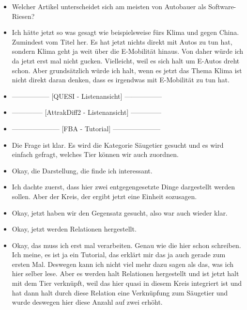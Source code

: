 {\begin{itemize}[]
    Vielleicht aus dem Gefühl heraus \flqq Auto-Bloggerin nimmt Tesla-Modell auseinander\frqq{}. 
    Einfach, weil es da wahrscheinlich sehr viel um Software gehen wird und um den Autobauer an sich.
    \item {} Welcher Artikel unterscheidet sich am meisten von \flqq Autobauer als Software-Riesen\frqq{}?
    \item {} Ich hätte jetzt so was gesagt wie beispielsweise \flqq fürs Klima und gegen China\frqq{}. 
    Zumindest vom Titel her.
    Es hat jetzt nichts direkt mit Autos zu tun hat, sondern Klima geht ja weit über die E-Mobilität hinaus.
    Von daher würde ich da jetzt erst mal nicht gucken. 
    Vielleicht, weil es sich halt um E-Autos dreht schon. 
    Aber grundsätzlich würde ich halt, wenn es jetzt das Thema Klima ist nicht direkt daran denken, dass es irgendwas mit E-Mobilität zu tun hat.
    \item {-----------------} [QUESI - Listenansicht] {-----------------}
    \item {--------------} [AttrakDiff2 - Listenansicht] {--------------}
    \item {---------------------} [FBA - Tutorial] {---------------------}
    \item {} Die Frage ist klar. 
    Es wird die Kategorie Säugetier gesucht und es wird einfach gefragt, welches Tier können wir auch zuordnen.
    \item {} Okay, die Darstellung, die finde ich interessant.
    \item {} Ich dachte zuerst, dass hier zwei entgegengesetzte Dinge dargestellt werden sollen. Aber der Kreis, der ergibt jetzt eine Einheit sozusagen.
    \item {} Okay, jetzt haben wir den Gegensatz gesucht, also war auch wieder klar.
    \item {} Okay, jetzt werden Relationen hergestellt.
    \item {} Okay, das muss ich erst mal verarbeiten.
    Genau wie die hier schon schreiben.
    Ich meine, es ist ja ein Tutorial, das erklärt mir das ja auch gerade zum ersten Mal.
    Deswegen kann ich nicht viel mehr dazu sagen als das, was ich hier selber lese.
    Aber es werden halt Relationen hergestellt und ist jetzt halt mit dem Tier verknüpft, weil das hier quasi in diesem Kreis integriert ist und hat dann halt durch diese Relation eine Verknüpfung zum Säugetier und wurde deswegen hier diese Anzahl auf zwei erhöht.

\end{itemize}}
